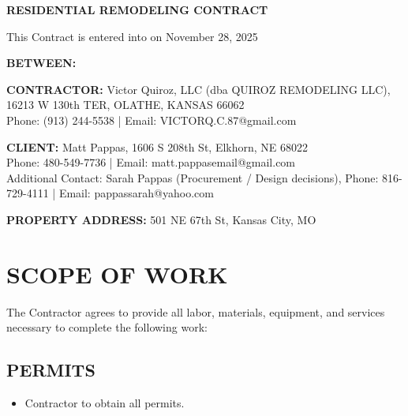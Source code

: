 \documentclass[10pt,letterpaper]{article}
\begin{document}
\begin{center}
{\Large\bfseries RESIDENTIAL REMODELING CONTRACT}
\end{center}

\vspace{0.5em}

\noindent This Contract is entered into on November 28, 2025

\vspace{0.5em}

\noindent\textbf{BETWEEN:}

\vspace{0.3em}

\noindent\textbf{CONTRACTOR:} Victor Quiroz, LLC (dba QUIROZ REMODELING LLC), 16213 W 130th TER, OLATHE, KANSAS 66062\\
Phone: (913) 244-5538 | Email: VICTORQ.C.87@gmail.com

\vspace{0.5em}

\noindent\textbf{CLIENT:} Matt Pappas, 1606 S 208th St, Elkhorn, NE 68022\\
Phone: 480-549-7736 | Email: matt.pappasemail@gmail.com\\
Additional Contact: Sarah Pappas (Procurement / Design decisions), Phone: 816-729-4111 | Email: pappassarah@yahoo.com

\vspace{0.5em}

\noindent\textbf{PROPERTY ADDRESS:} 501 NE 67th St, Kansas City, MO

\vspace{1em}

\section{SCOPE OF WORK}

The Contractor agrees to provide all labor, materials, equipment, and services necessary to complete the following work:

\subsection{PERMITS}
\begin{itemize}[leftmargin=*]
\item Contractor to obtain all permits.
\end{itemize}
\end{document}
